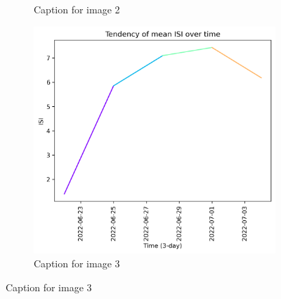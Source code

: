 \begin{figure}[h]
\begin{subfigure}{0.3\textwidth}
        \caption{Caption for image 2}
        \label{fig:img2}
    \end{subfigure}
    \hfill
    \begin{subfigure}{0.3\textwidth}
        \centering
        \includegraphics[width=\textwidth]{graphs/2022/tendency/2022_tendency_graph_ISI.png}
        \caption{Caption for image 3}
        \label{fig:img3}
    \end{subfigure}
    
    \label{fig:all_images}
\end{figure}


